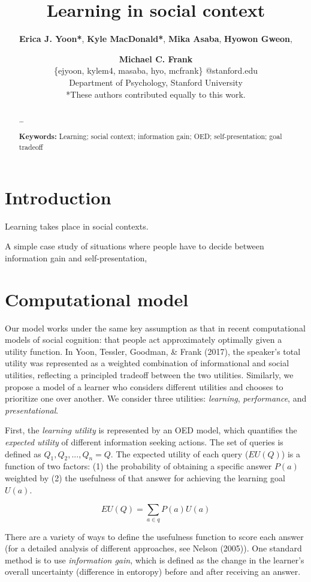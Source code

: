\documentclass[10pt, letterpaper]{article}
\title{Learning in social context}
\author{{\large \bf Erica J. Yoon*}, {\large \bf Kyle MacDonald*}, {\large \bf Mika Asaba}, {\large \bf Hyowon Gweon}, \and {\large \bf Michael C. Frank} \\ \{ejyoon, kylem4, masaba, hyo, mcfrank\} @stanford.edu \\ Department of Psychology, Stanford University \\ *These authors contributed equally to this work.}
\begin{document}
\maketitle

\begin{abstract}
\ldots{}

\textbf{Keywords:}
Learning; social context; information gain; OED; self-presentation; goal
tradeoff
\end{abstract}

\section{Introduction}\label{introduction}

Learning takes place in social contexts.

A simple case study of situations where people have to decide between
information gain and self-presentation,

\section{Computational model}\label{computational-model}

Our model works under the same key assumption as that in recent
computational models of social cognition: that people act approximately
optimally given a utility function. In Yoon, Tessler, Goodman, \& Frank
(2017), the speaker's total utility was represented as a weighted
combination of informational and social utilities, reflecting a
principled tradeoff between the two utilities. Similarly, we propose a
model of a learner who considers different utilities and chooses to
prioritize one over another. We consider three utilities:
\emph{learning}, \emph{performance}, and \emph{presentational}.

First, the \emph{learning utility} is represented by an OED model, which
quantifies the \emph{expected utility} of different information seeking
actions. The set of queries is defined as \(Q_1, Q_2, ..., Q_n = {Q}\).
The expected utility of each query (\(EU(Q)\)) is a function of two
factors: (1) the probability of obtaining a specific answer \(P(a)\)
weighted by (2) the usefulness of that answer for achieving the learning
goal \(U(a)\).

\[EU(Q) = \sum_{a\in q}{P(a)U(a)}\]

There are a variety of ways to define the usefulness function to score
each answer (for a detailed analysis of different approaches, see Nelson
(2005)). One standard method is to use \emph{information gain}, which is
defined as the change in the learner's overall uncertainty (difference
in entoropy) before and after receiving an answer.
\end{document}
